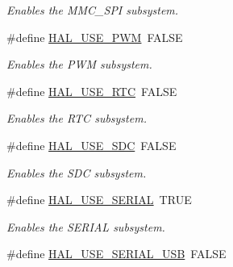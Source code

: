 \begin{DoxyCompactItemize}
\begin{DoxyCompactList}\small\item\em Enables the M\+M\+C\+\_\+\+S\+P\+I subsystem. \end{DoxyCompactList}\item 
\hypertarget{group__HAL__CONF_gafb7a560610f96b2858d51c36d65f8c2f}{\#define \hyperlink{group__HAL__CONF_gafb7a560610f96b2858d51c36d65f8c2f}{H\+A\+L\+\_\+\+U\+S\+E\+\_\+\+P\+W\+M}~F\+A\+L\+S\+E}\label{group__HAL__CONF_gafb7a560610f96b2858d51c36d65f8c2f}

\begin{DoxyCompactList}\small\item\em Enables the P\+W\+M subsystem. \end{DoxyCompactList}\item 
\hypertarget{group__HAL__CONF_ga17d20632810c9bb1601a19973977f55c}{\#define \hyperlink{group__HAL__CONF_ga17d20632810c9bb1601a19973977f55c}{H\+A\+L\+\_\+\+U\+S\+E\+\_\+\+R\+T\+C}~F\+A\+L\+S\+E}\label{group__HAL__CONF_ga17d20632810c9bb1601a19973977f55c}

\begin{DoxyCompactList}\small\item\em Enables the R\+T\+C subsystem. \end{DoxyCompactList}\item 
\hypertarget{group__HAL__CONF_ga06f315a18b911f426da736c42ab20325}{\#define \hyperlink{group__HAL__CONF_ga06f315a18b911f426da736c42ab20325}{H\+A\+L\+\_\+\+U\+S\+E\+\_\+\+S\+D\+C}~F\+A\+L\+S\+E}\label{group__HAL__CONF_ga06f315a18b911f426da736c42ab20325}

\begin{DoxyCompactList}\small\item\em Enables the S\+D\+C subsystem. \end{DoxyCompactList}\item 
\hypertarget{group__HAL__CONF_ga720d92b9c3a00d952f6f0c8665b54ebb}{\#define \hyperlink{group__HAL__CONF_ga720d92b9c3a00d952f6f0c8665b54ebb}{H\+A\+L\+\_\+\+U\+S\+E\+\_\+\+S\+E\+R\+I\+A\+L}~T\+R\+U\+E}\label{group__HAL__CONF_ga720d92b9c3a00d952f6f0c8665b54ebb}

\begin{DoxyCompactList}\small\item\em Enables the S\+E\+R\+I\+A\+L subsystem. \end{DoxyCompactList}\item 
\hypertarget{group__HAL__CONF_ga79c970fb20565143ad8b65720c0b2d0e}{\#define \hyperlink{group__HAL__CONF_ga79c970fb20565143ad8b65720c0b2d0e}{H\+A\+L\+\_\+\+U\+S\+E\+\_\+\+S\+E\+R\+I\+A\+L\+\_\+\+U\+S\+B}~F\+A\+L\+S\+E}\label{group__HAL__CONF_ga79c970fb20565143ad8b65720c0b2d0e}


\end{DoxyCompactItemize}
